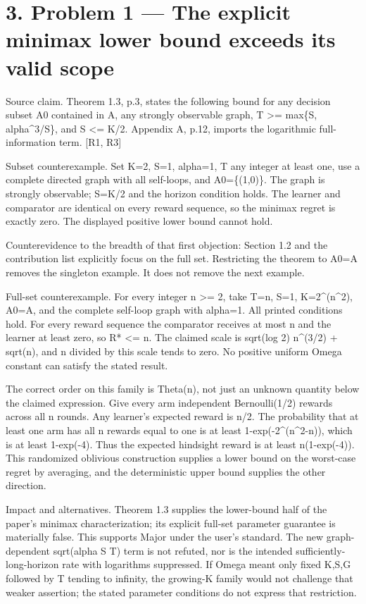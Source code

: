 \documentclass[10pt]{article}
\begin{document}
\section*{3. Problem 1 — The explicit minimax lower bound exceeds its valid scope}
Source claim. Theorem 1.3, p.3, states the following bound for any decision subset A0 contained in A, any strongly observable graph, T >= max\{S, alpha\textasciicircum{}3/S\}, and S <= K/2. Appendix A, p.12, imports the logarithmic full-information term. [R1, R3]\par
Subset counterexample. Set K=2, S=1, alpha=1, T any integer at least one, use a complete directed graph with all self-loops, and A0=\{(1,0)\}. The graph is strongly observable; S=K/2 and the horizon condition holds. The learner and comparator are identical on every reward sequence, so the minimax regret is exactly zero. The displayed positive lower bound cannot hold.\par
Counterevidence to the breadth of that first objection: Section 1.2 and the contribution list explicitly focus on the full set. Restricting the theorem to A0=A removes the singleton example. It does not remove the next example.\par
Full-set counterexample. For every integer n >= 2, take T=n, S=1, K=2\textasciicircum{}(n\textasciicircum{}2), A0=A, and the complete self-loop graph with alpha=1. All printed conditions hold. For every reward sequence the comparator receives at most n and the learner at least zero, so R* <= n. The claimed scale is sqrt(log 2) n\textasciicircum{}(3/2) + sqrt(n), and n divided by this scale tends to zero. No positive uniform Omega constant can satisfy the stated result.\par
The correct order on this family is Theta(n), not just an unknown quantity below the claimed expression. Give every arm independent Bernoulli(1/2) rewards across all n rounds. Any learner’s expected reward is n/2. The probability that at least one arm has all n rewards equal to one is at least 1-exp(-2\textasciicircum{}(n\textasciicircum{}2-n)), which is at least 1-exp(-4). Thus the expected hindsight reward is at least n(1-exp(-4)). This randomized oblivious construction supplies a lower bound on the worst-case regret by averaging, and the deterministic upper bound supplies the other direction.\par
Impact and alternatives. Theorem 1.3 supplies the lower-bound half of the paper’s minimax characterization; its explicit full-set parameter guarantee is materially false. This supports Major under the user’s standard. The new graph-dependent sqrt(alpha S T) term is not refuted, nor is the intended sufficiently-long-horizon rate with logarithms suppressed. If Omega meant only fixed K,S,G followed by T tending to infinity, the growing-K family would not challenge that weaker assertion; the stated parameter conditions do not express that restriction.\par
\end{document}
